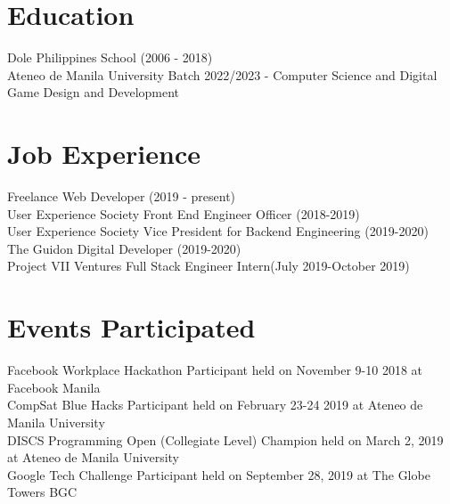\documentclass{article}
\begin{document}

    \section{Education}
    Dole Philippines School (2006 - 2018)\\
    Ateneo de Manila University Batch 2022/2023 - Computer Science and Digital Game Design and Development

    \section{Job Experience}
    Freelance Web Developer (2019 - present)\\
    User Experience Society Front End Engineer Officer (2018-2019)\\
    User Experience Society Vice President for Backend Engineering (2019-2020)\\
    The Guidon Digital Developer (2019-2020)\\
    Project VII Ventures Full Stack Engineer Intern(July 2019-October 2019)

    \section{Events Participated}

    Facebook Workplace Hackathon Participant held on November 9-10 2018 at Facebook Manila\\
    CompSat Blue Hacks Participant held on February 23-24 2019 at Ateneo de Manila University\\
    DISCS Programming Open (Collegiate Level) Champion held on March 2, 2019 at Ateneo de Manila University\\
    Google Tech Challenge Participant held on September 28, 2019 at The Globe Towers BGC

    
\end{document}
